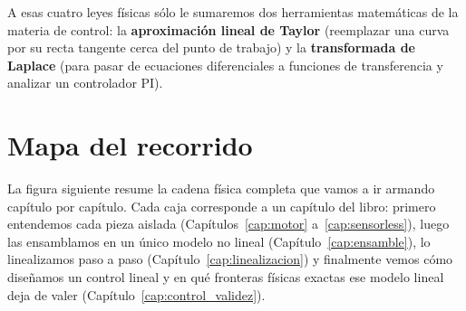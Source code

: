 \documentclass[11pt,a4paper,oneside]{book}
\begin{document}
A esas cuatro leyes físicas sólo le sumaremos dos herramientas matemáticas de la
materia de control: la \textbf{aproximación lineal de Taylor} (reemplazar una
curva por su recta tangente cerca del punto de trabajo) y la
\textbf{transformada de Laplace} (para pasar de ecuaciones diferenciales a
funciones de transferencia y analizar un controlador PI).

\section*{Mapa del recorrido}
La figura siguiente resume la cadena física completa que vamos a ir armando
capítulo por capítulo. Cada caja corresponde a un capítulo del libro: primero
entendemos cada pieza aislada (Capítulos~\ref{cap:motor} a~\ref{cap:sensorless}),
luego las ensamblamos en un único modelo no lineal (Capítulo~\ref{cap:ensamble}),
lo linealizamos paso a paso (Capítulo~\ref{cap:linealizacion}) y finalmente
vemos cómo diseñamos un control lineal y en qué fronteras físicas exactas ese
modelo lineal deja de valer (Capítulo~\ref{cap:control_validez}).
\end{document}
